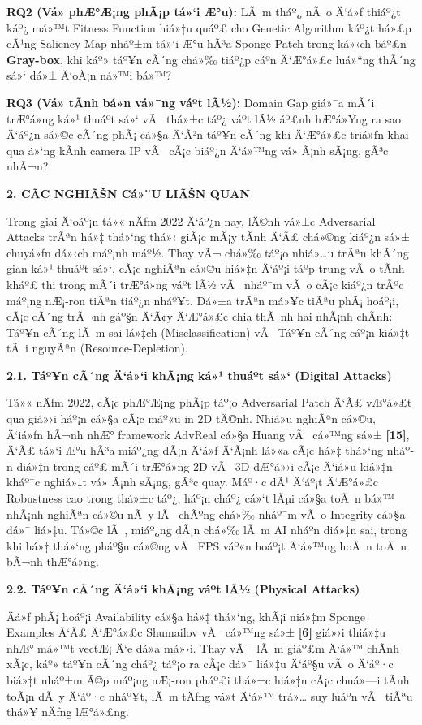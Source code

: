 \documentclass[]{article}
\begin{document}
\textbf{RQ2 (Vá» phÆ°Æ¡ng phÃ¡p tá»‘i Æ°u):} LÃ m tháº¿ nÃ o Ä‘á»ƒ thiáº¿t káº¿ má»™t Fitness 
Function hiá»‡u quáº£ cho Genetic Algorithm káº¿t há»£p cÃ¹ng Saliency Map nháº±m 
tá»‘i Æ°u hÃ³a Sponge Patch trong ká»‹ch báº£n \textbf{Gray-box}, khi káº» táº¥n cÃ´ng 
chá»‰ tiáº¿p cáº­n Ä‘Æ°á»£c luá»“ng thÃ´ng sá»‘ dá»± Ä‘oÃ¡n ná»™i bá»™?

\textbf{RQ3 (Vá» tÃ­nh bá»n vá»¯ng váº­t lÃ½):} Domain Gap giá»¯a mÃ´i trÆ°á»ng ká»¹ 
thuáº­t sá»‘ vÃ  thá»±c táº¿ váº­t lÃ½ áº£nh hÆ°á»Ÿng ra sao Ä‘áº¿n sá»©c cÃ´ng phÃ¡ cá»§a Ä‘Ã²n táº¥n 
cÃ´ng khi Ä‘Æ°á»£c triá»ƒn khai qua á»‘ng kÃ­nh camera IP vÃ  cÃ¡c biáº¿n Ä‘á»™ng vá» Ã¡nh 
sÃ¡ng, gÃ³c nhÃ¬n?

\textbf{2. CÃC NGHIÃŠN Cá»¨U LIÃŠN QUAN}

Trong giai Ä‘oáº¡n tá»« nÄƒm 2022 Ä‘áº¿n nay, lÄ©nh vá»±c Adversarial Attacks trÃªn 
há»‡ thá»‘ng thá»‹ giÃ¡c mÃ¡y tÃ­nh Ä‘Ã£ chá»©ng kiáº¿n sá»± chuyá»ƒn dá»‹ch máº¡nh máº½. Thay vÃ¬ 
chá»‰ táº¡o nhiá»…u trÃªn khÃ´ng gian ká»¹ thuáº­t sá»‘, cÃ¡c nghiÃªn cá»©u hiá»‡n Ä‘áº¡i táº­p 
trung vÃ o tÃ­nh kháº£ thi trong mÃ´i trÆ°á»ng váº­t lÃ½ vÃ  nháº¯m vÃ o cÃ¡c kiáº¿n trÃºc 
máº¡ng nÆ¡-ron tiÃªn tiáº¿n nháº¥t. Dá»±a trÃªn má»¥c tiÃªu phÃ¡ hoáº¡i, cÃ¡c cÃ´ng trÃ¬nh 
gáº§n Ä‘Ã¢y Ä‘Æ°á»£c chia thÃ nh hai nhÃ¡nh chÃ­nh: Táº¥n cÃ´ng lÃ m sai lá»‡ch
(Misclassification) vÃ  Táº¥n cÃ´ng cáº¡n kiá»‡t tÃ i nguyÃªn
(Resource-Depletion).

\textbf{2.1. Táº¥n cÃ´ng Ä‘á»‘i khÃ¡ng ká»¹ thuáº­t sá»‘ (Digital Attacks)}

Tá»« nÄƒm 2022, cÃ¡c phÆ°Æ¡ng phÃ¡p táº¡o Adversarial Patch Ä‘Ã£ vÆ°á»£t qua giá»›i háº¡n 
cá»§a cÃ¡c máº«u in 2D tÄ©nh. Nhiá»u nghiÃªn cá»©u, Ä‘iá»ƒn hÃ¬nh nhÆ° framework AdvReal 
cá»§a Huang vÃ  cá»™ng sá»± \textbf{{[}15{]}}, Ä‘Ã£ tá»‘i Æ°u hÃ³a miáº¿ng dÃ¡n Ä‘á»ƒ Ä‘Ã¡nh 
lá»«a cÃ¡c há»‡ thá»‘ng nháº­n diá»‡n trong cáº£ mÃ´i trÆ°á»ng 2D vÃ  3D dÆ°á»›i cÃ¡c Ä‘iá»u kiá»‡n 
kháº¯c nghiá»‡t vá» Ã¡nh sÃ¡ng, gÃ³c quay. Máº·c dÃ¹ Ä‘áº¡t Ä‘Æ°á»£c Robustness cao trong 
thá»±c táº¿, háº¡n cháº¿ cá»‘t lÃµi cá»§a toÃ n bá»™ nhÃ¡nh nghiÃªn cá»©u nÃ y lÃ  chÃºng chá»‰ 
nháº¯m vÃ o Integrity cá»§a dá»¯ liá»‡u. Tá»©c lÃ , miáº¿ng dÃ¡n chá»‰ lÃ m AI nháº­n diá»‡n
sai, trong khi há»‡ thá»‘ng pháº§n cá»©ng vÃ  FPS váº«n hoáº¡t Ä‘á»™ng hoÃ n toÃ n bÃ¬nh 
thÆ°á»ng.

\textbf{2.2. Táº¥n cÃ´ng Ä‘á»‘i khÃ¡ng váº­t lÃ½ (Physical Attacks)}

Äá»ƒ phÃ¡ hoáº¡i Availability cá»§a há»‡ thá»‘ng, khÃ¡i niá»‡m Sponge Examples Ä‘Ã£ Ä‘Æ°á»£c 
Shumailov vÃ  cá»™ng sá»± \textbf{{[}6{]}} giá»›i thiá»‡u nhÆ° má»™t vectÆ¡ Ä‘e dá»a má»›i. 
Thay vÃ¬ lÃ m giáº£m Ä‘á»™ chÃ­nh xÃ¡c, káº» táº¥n cÃ´ng cháº¿ táº¡o ra cÃ¡c dá»¯ liá»‡u Ä‘áº§u vÃ o 
Ä‘áº·c biá»‡t nháº±m Ã©p máº¡ng nÆ¡-ron pháº£i thá»±c hiá»‡n cÃ¡c chuá»—i tÃ­nh toÃ¡n dÃ y Ä‘áº·c 
nháº¥t, lÃ m tÄƒng vá»t Ä‘á»™ trá»… suy luáº­n vÃ  tiÃªu thá»¥ nÄƒng lÆ°á»£ng.
\end{document}
